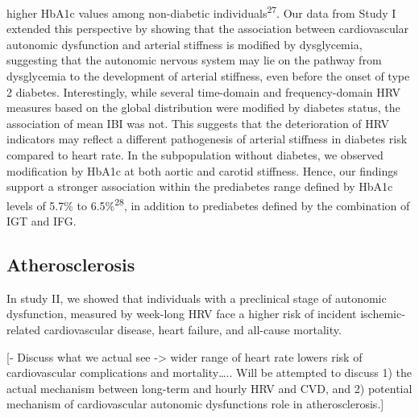 \documentclass[
  a4paper,
  headsepline=true,
  open=any]{scrbook}
\begin{document}
higher HbA1c values among non-diabetic individuals\textsuperscript{27}.
Our data from Study I extended this perspective by showing that the
association between cardiovascular autonomic dysfunction and arterial
stiffness is modified by dysglycemia, suggesting that the autonomic
nervous system may lie on the pathway from dysglycemia to the
development of arterial stiffness, even before the onset of type 2
diabetes. Interestingly, while several time-domain and frequency-domain
HRV measures based on the global distribution were modified by diabetes
status, the association of mean IBI was not. This suggests that the
deterioration of HRV indicators may reflect a different pathogenesis of
arterial stiffness in diabetes risk compared to heart rate. In the
subpopulation without diabetes, we observed modification by HbA1c at
both aortic and carotid stiffness. Hence, our findings support a
stronger association within the prediabetes range defined by HbA1c
levels of 5.7\% to 6.5\%\textsuperscript{28}, in addition to prediabetes
defined by the combination of IGT and IFG.

\hypertarget{atherosclerosis-1}{%
\subsection{Atherosclerosis}\label{atherosclerosis-1}}

In study II, we showed that individuals with a preclinical stage of
autonomic dysfunction, measured by week-long HRV face a higher risk of
incident ischemic-related cardiovascular disease, heart failure, and
all-cause mortality.

{[}- Discuss what we actual see -\textgreater{} wider range of heart
rate lowers risk of cardiovascular complications and mortality\ldots..
Will be attempted to discuss 1) the actual mechanism between long-term
and hourly HRV and CVD, and 2) potential mechanism of cardiovascular
autonomic dysfunctions role in atherosclerosis.{]}
\end{document}
